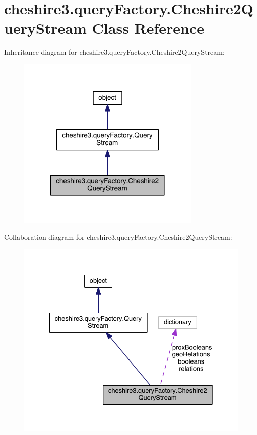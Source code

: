 \hypertarget{classcheshire3_1_1query_factory_1_1_cheshire2_query_stream}{\section{cheshire3.\-query\-Factory.\-Cheshire2\-Query\-Stream Class Reference}
\label{classcheshire3_1_1query_factory_1_1_cheshire2_query_stream}
}


Inheritance diagram for cheshire3.\-query\-Factory.\-Cheshire2\-Query\-Stream\-:
\nopagebreak
\begin{figure}[H]
\begin{center}
\leavevmode
\includegraphics[width=248pt]{classcheshire3_1_1query_factory_1_1_cheshire2_query_stream__inherit__graph}
\end{center}
\end{figure}


Collaboration diagram for cheshire3.\-query\-Factory.\-Cheshire2\-Query\-Stream\-:
\nopagebreak
\begin{figure}[H]
\begin{center}
\leavevmode
\includegraphics[width=331pt]{classcheshire3_1_1query_factory_1_1_cheshire2_query_stream__coll__graph}
\end{center}
\end{figure}
